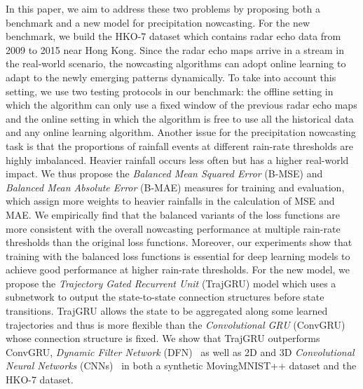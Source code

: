 \documentclass{article}
\begin{document}
In this paper, we aim to address these two problems by proposing both a
benchmark and a new model for precipitation nowcasting. For the new benchmark,
we build the HKO-7 dataset which contains radar echo data from 2009 to 2015 near
Hong Kong. Since the radar echo maps arrive in a stream in the real-world
scenario, the nowcasting algorithms can adopt online learning to adapt to the newly
emerging patterns dynamically. To take into account this setting, we use two
testing protocols in our benchmark: the offline setting in which the algorithm
can only use a fixed window of the previous radar echo maps and the online
setting in which the algorithm is free to use all the historical data and any
online learning algorithm. Another issue for the precipitation nowcasting task
is that the proportions of rainfall events at different rain-rate thresholds are
highly imbalanced. Heavier rainfall occurs less often but has a higher
real-world impact. We thus propose the \emph{Balanced Mean Squared Error}
(B-MSE) and \emph{Balanced Mean Absolute Error} (B-MAE) measures for training
and evaluation, which assign more weights to heavier rainfalls in the
calculation of MSE and MAE. We empirically find that the balanced variants of
the loss functions are more consistent with the overall nowcasting performance
at multiple rain-rate thresholds than the original loss functions. Moreover, our
experiments show that training with the balanced loss functions is essential for
deep learning models to achieve good performance at higher rain-rate thresholds.
For the new model, we propose the \emph{Trajectory Gated Recurrent Unit}
(TrajGRU) model which uses a subnetwork to output the state-to-state connection
structures before state transitions. TrajGRU allows the state to be aggregated
along some learned trajectories and thus is more flexible than the
\emph{Convolutional GRU} (ConvGRU)~\cite{ballas2016delving} whose connection
structure is fixed. We show that TrajGRU outperforms ConvGRU, \emph{Dynamic
  Filter Network} (DFN)~\cite{de2016dynamic} as well as 2D and 3D
\emph{Convolutional Neural Networks}
(CNNs)~\cite{mathieu2015deep,vondrick2016generating} in both a synthetic
MovingMNIST++ dataset and the HKO-7 dataset.
\end{document}
